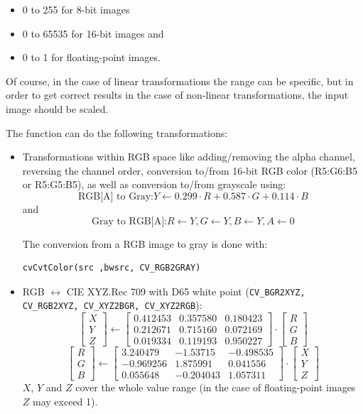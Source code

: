 \begin{itemize}
 \item 0 to 255 for 8-bit images
 \item 0 to 65535 for 16-bit images and
 \item 0 to 1 for floating-point images.
\end{itemize}

Of course, in the case of linear transformations the range can be
specific, but in order to get correct results in the case of non-linear
transformations, the input image should be scaled.

The function can do the following transformations:

\begin{itemize}
 \item Transformations within RGB space like adding/removing the alpha channel, reversing the channel order, conversion to/from 16-bit RGB color (R5:G6:B5 or R5:G5:B5), as well as conversion to/from grayscale using:
 \[
 \text{RGB[A] to Gray:} Y \leftarrow 0.299 \cdot R + 0.587 \cdot G + 0.114 \cdot B
 \]
 and
 \[
 \text{Gray to RGB[A]:} R \leftarrow Y, G \leftarrow Y, B \leftarrow Y, A \leftarrow 0
 \]

The conversion from a RGB image to gray is done with:
\begin{lstlisting}
cvCvtColor(src ,bwsrc, CV_RGB2GRAY)
\end{lstlisting}

 \item RGB $\leftrightarrow$ CIE XYZ.Rec 709 with D65 white point (\texttt{CV\_BGR2XYZ, CV\_RGB2XYZ, CV\_XYZ2BGR, CV\_XYZ2RGB}):
 \[
 \begin{bmatrix}
 X \\
 Y \\
 Z
 \end{bmatrix}
 \leftarrow
 \begin{bmatrix}
0.412453 & 0.357580 & 0.180423\\
0.212671 & 0.715160 & 0.072169\\
0.019334 & 0.119193 & 0.950227
 \end{bmatrix}
 \cdot
 \begin{bmatrix}
 R \\
 G \\
 B
 \end{bmatrix}
 \]
 \[
 \begin{bmatrix}
 R \\
 G \\
 B
 \end{bmatrix}
 \leftarrow
 \begin{bmatrix}
3.240479 & -1.53715 & -0.498535\\
-0.969256 &  1.875991 & 0.041556\\
0.055648 & -0.204043 & 1.057311
 \end{bmatrix}
 \cdot
 \begin{bmatrix}
 X \\
 Y \\
 Z
 \end{bmatrix}
 \]
$X$, $Y$ and $Z$ cover the whole value range (in the case of floating-point images $Z$ may exceed 1).


\end{itemize}
